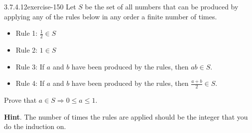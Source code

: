 \documentclass[twoside,10pt,]{book}
\numberwithin{equation}{section}
\begin{document}
\begin{divisionsolution}{3.7.4.12}{}{exercise-150}%
\hypertarget{p-1370}{}%
Let \(S\) be the set of all numbers that can be produced by applying any of the rules below in any order a finite number of times.\leavevmode%
\begin{itemize}[label=\textbullet]
\item{}Rule 1: \(\frac{1}{2} \in  S\)%
\item{}Rule 2: \(1 \in  S\)%
\item{}Rule 3: If \(a\) and \(b\) have been produced by the rules, then \(a b \in  S\).%
\item{}Rule 4: If \(a\) and \(b\) have been produced by the rules, then \(\frac{a+b}{2}\in S\).%
\end{itemize}
Prove  that \(a\in S \Rightarrow  0 \le a \leq  1\).%
\par\smallskip%
\noindent\textbf{Hint}.\quad%
\hypertarget{p-1371}{}%
The number of times the rules are applied should be the integer that you do the induction on.%
\end{divisionsolution}%
\end{document}
